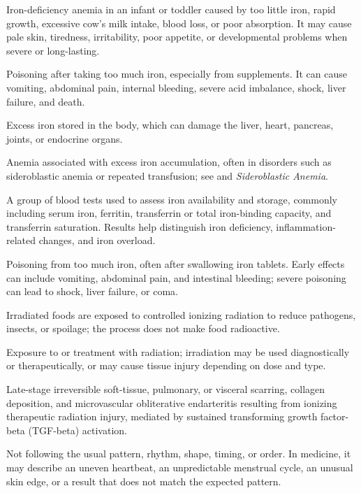  Iron-deficiency anemia in an infant or toddler caused by too little iron, rapid growth, excessive cow’s milk intake, blood loss, or poor absorption. It may cause pale skin, tiredness, irritability, poor appetite, or developmental problems when severe or long-lasting.

 Poisoning after taking too much iron, especially from supplements. It can cause vomiting, abdominal pain, internal bleeding, severe acid imbalance, shock, liver failure, and death.

 Excess iron stored in the body, which can damage the liver, heart, pancreas, joints, or endocrine organs.

 Anemia associated with excess iron accumulation, often in disorders such as sideroblastic anemia or repeated transfusion; see  and \textit{Sideroblastic Anemia}.

 A group of blood tests used to assess iron availability and storage, commonly including serum iron, ferritin, transferrin or total iron-binding capacity, and transferrin saturation. Results help distinguish iron deficiency, inflammation-related changes, and iron overload.

 Poisoning from too much iron, often after swallowing iron tablets. Early effects can include vomiting, abdominal pain, and intestinal bleeding; severe poisoning can lead to shock, liver failure, or coma.

 Irradiated foods are exposed to controlled ionizing radiation to reduce pathogens, insects, or spoilage; the process does not make food radioactive.

 Exposure to or treatment with radiation; irradiation may be used diagnostically or therapeutically, or may cause tissue injury depending on dose and type.

 Late-stage irreversible soft-tissue, pulmonary, or visceral scarring, collagen deposition, and microvascular obliterative endarteritis resulting from ionizing therapeutic radiation injury, mediated by sustained transforming growth factor-beta (TGF-beta) activation.

 Not following the usual pattern, rhythm, shape, timing, or order. In medicine, it may describe an uneven heartbeat, an unpredictable menstrual cycle, an unusual skin edge, or a result that does not match the expected pattern.

